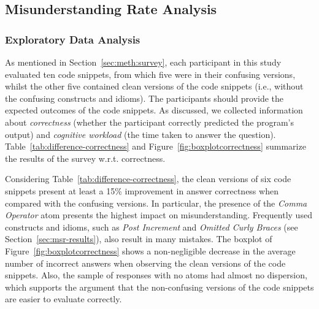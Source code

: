   


\subsection{Misunderstanding Rate Analysis}

\subsubsection*{Exploratory Data Analysis}

As mentioned in Section~\ref{sec:meth:survey}, each participant in this study evaluated ten
code snippets, from which five were in their confusing versions, whilst the other five contained clean versions of the code snippets (i.e., without the confusing constructs and idioms). The participants should provide the expected outcomes of the code snippets. As discussed, we collected information about \emph{correctness} (whether the participant correctly predicted the program's output) and \emph{cognitive workload} (the time taken to answer the question). 
Table~\ref{tab:difference-correctness} and Figure~\ref{fig:boxplotcorrectness} summarize the results of the survey w.r.t. correctness.

Considering Table~\ref{tab:difference-correctness}, the clean versions of six code snippets present at least a 15\% improvement in answer correctness when compared with the confusing versions. In particular, the presence of the \emph{Comma Operator} atom presents the highest impact on misunderstanding. 
Frequently used constructs and idioms, such as \emph{Post Increment} and \emph{Omitted Curly Braces} (see Section~\ref{sec:msr-results}), also result in many mistakes. %
The boxplot of Figure~\ref{fig:boxplotcorrectness} shows a non-negligible decrease in the average number of incorrect answers when observing the clean versions of the code snippets. Also, the sample of responses with no atoms had almost no dispersion, which supports the
argument that the non-confusing versions of the code snippets are easier to evaluate correctly. 



